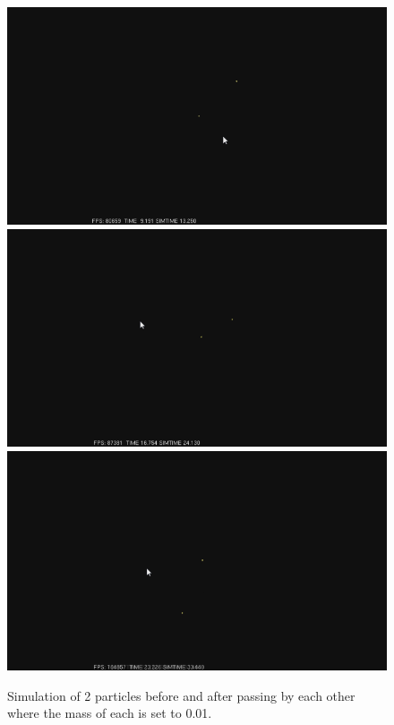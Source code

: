 \documentclass{egpubl}
\begin{document}
\begin{figure}[H]
  \centering
  \includegraphics[width=.8\linewidth]{Screen_Caps/001_and_001_1.png}
  \includegraphics[width=.8\linewidth]{Screen_Caps/001_and_001_2.png}
  \includegraphics[width=.8\linewidth]{Screen_Caps/001_and_001_3.png}
  \caption{\label{fig:Fig1}
           Simulation of 2 particles before and after passing by each other where the mass of each is set to 0.01.}
\end{figure}
\end{document}
